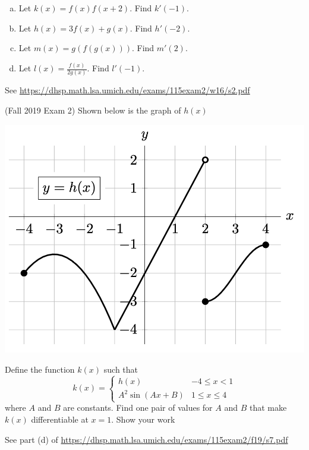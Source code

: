 \documentclass[11pt]{exam}
\begin{document}
\begin{questions}
\begin{multicols}{2}
\begin{enumerate}[(a)]
	\item Let $k(x) = f(x)f(x+2)$. Find $k'(-1)$.
	\item Let $h(x) = 3f(x) + g(x)$. Find $h'(-2)$.
	\item Let $m(x) = g(f(g(x)))$. Find $m'(2)$.
	\item Let $l(x) = \frac{f(x)}{2g(x)}$. Find $l'(-1)$.
	\end{enumerate}
	\end{multicols}
        \begin{solution}
          See \href{https://dhsp.math.lsa.umich.edu/exams/115exam2/w16/s2.pdf}{https://dhsp.math.lsa.umich.edu/exams/115exam2/w16/s2.pdf}
        \end{solution}
      \question (Fall 2019 Exam 2) Shown below is the graph of \(h(x)\)
        \begin{center}
          \includegraphics[scale=0.4]{graphh2}
        \end{center}
        Define the function \(k(x)\) such that \[
          k(x) =
          \begin{cases}
            h(x) & -4 \leq x < 1 \\
            A^2 \sin(Ax+B) & 1 \leq x \leq 4
          \end{cases}
        \]
        where \(A\) and \(B\) are constants. Find one pair of values for \(A\) and \(B\) that make \(k(x)\) differentiable
        at \(x = 1\). Show your work
        \begin{solution}
          See part (d) of \href{https://dhsp.math.lsa.umich.edu/exams/115exam2/f19/s7.pdf}{https://dhsp.math.lsa.umich.edu/exams/115exam2/f19/s7.pdf}

\end{solution}
\end{questions}
\end{document}
